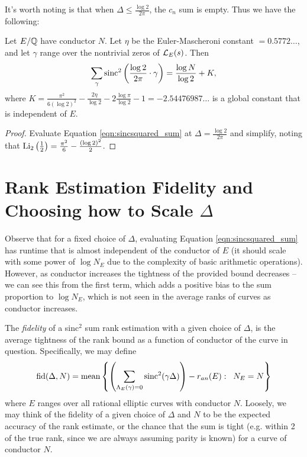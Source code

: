 It's worth noting is that when $\Delta \le \frac{\log 2}{2\pi}$, the $c_n$ sum is empty. Thus we have the following:
\begin{corollary}
Let $E/\mathbb{Q}$ have conductor $N$. Let $\eta$ be the Euler-Mascheroni constant $=0.5772\ldots$, and let $\gamma$ range over the nontrivial zeros of $\mathcal{L}_E(s)$. Then
\begin{equation}
\sum_{\gamma} \text{sinc}^2\left(\frac{\log 2}{2\pi} \cdot \gamma \right) = \frac{\log N}{\log 2} + K,
\end{equation}
where $K = \frac{\pi^2}{6(\log 2)^2} - \frac{2\eta}{\log 2} - 2\frac{\log \pi}{\log 2} - 1 = -2.54476987\ldots$ is a global constant that is independent of $E$.
\end{corollary}
\begin{proof}
Evaluate Equation \ref{eqn:sincsquared_sum} at $\Delta = \frac{\log 2}{2\pi}$ and simplify, noting that $\text{Li}_2\left(\frac{1}{2}\right) = \frac{\pi^2}{6} - \frac{(\log 2)^2}{2}$.
\end{proof}

\newpage
\section{Rank Estimation Fidelity and Choosing how to Scale $\Delta$}

Observe that for a fixed choice of $\Delta$, evaluating Equation \ref{eqn:sincsquared_sum} has runtime that is almost independent of the conductor of $E$ (it should scale with some power of $\log N_E$ due to the complexity of basic arithmetic operations). However, as conductor increases the tightness of the provided bound decreases -- we can see this from the first term, which adds a positive bias to the sum proportion to $\log N_E$, which is not seen in the average ranks of curves as conductor increases. \\

\begin{definition}
The {\it fidelity} of a sinc$^2$ sum rank estimation with a given choice of $\Delta$, is the average tightness of the rank bound as a function of conductor of the curve in question. Specifically, we may define
\begin{equation}
\mbox{fid}(\Delta,N) = \mbox{mean}\left\{\left(\sum_{\Lambda_E(\gamma)=0}\text{sinc}^2(\gamma \Delta)\right) - r_{an}(E):\;\; N_E = N\right\}
\end{equation}
where $E$ ranges over all rational elliptic curves with conductor $N$. Loosely, we may think of the fidelity of a given choice of $\Delta$ and $N$ to be the expected accuracy of the rank estimate, or the chance that the sum is tight (e.g. within 2 of the true rank, since we are always assuming parity is known) for a curve of conductor $N$. 
\end{definition}

